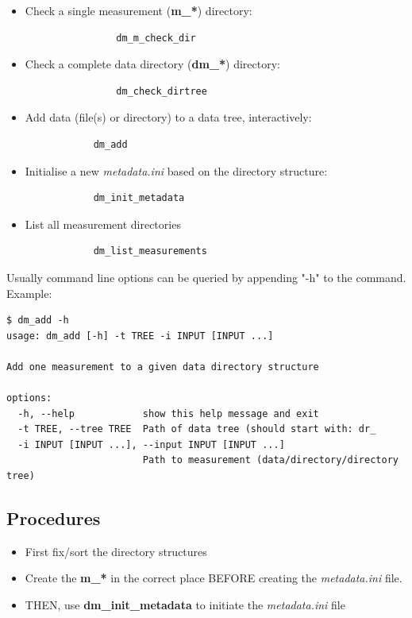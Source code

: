 \documentclass[fontsize=12]{scrartcl}
\begin{document}
\begin{itemize}
    \item Check a single measurement (\textbf{m\_*}) directory:
        \begin{verbatim}
                dm_m_check_dir
        \end{verbatim}
    \item Check a complete data directory (\textbf{dm\_*}) directory:
        \begin{verbatim}
                dm_check_dirtree
        \end{verbatim}
	\item Add data (file(s) or directory) to a data tree, interactively:
        \begin{verbatim}
            dm_add
        \end{verbatim}
    \item Initialise a new \textsl{metadata.ini} based on the directory structure:
        \begin{verbatim}
            dm_init_metadata
        \end{verbatim}
    \item List all measurement directories
        \begin{verbatim}
            dm_list_measurements
        \end{verbatim}
\end{itemize}

Usually command line options can be queried by appending "-h" to the command.
Example:
\begin{verbatim}
$ dm_add -h
usage: dm_add [-h] -t TREE -i INPUT [INPUT ...]

Add one measurement to a given data directory structure

options:
  -h, --help            show this help message and exit
  -t TREE, --tree TREE  Path of data tree (should start with: dr_
  -i INPUT [INPUT ...], --input INPUT [INPUT ...]
                        Path to measurement (data/directory/directory tree)
\end{verbatim}

\subsection{Procedures}

\begin{itemize}
    \item First fix/sort the directory structures
    \item Create the \textbf{m\_*} in the correct place BEFORE creating the
        \textsl{metadata.ini} file.
    \item THEN, use \textbf{dm\_init\_metadata} to initiate the
        \textsl{metadata.ini} file
\end{itemize}
\end{document}
